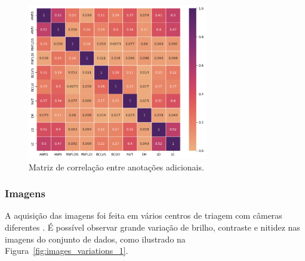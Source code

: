 \documentclass[12pt]{article}
\begin{document}
\begin{figure}[htb]
 \centering
 \includegraphics[width=0.7\textwidth]{images/correlation.png}
 \caption{Matriz de correlação entre anotações adicionais.}
 \label{fig:labels_correlation}
\end{figure}

\subsubsection{Imagens}
\label{sec:dataset:images}

A aquisição das imagens foi feita em vários centros de triagem com câmeras diferentes \cite{justraigs_article}.
É possível observar grande variação de brilho, contraste e nitidez nas imagens do conjunto de dados, como ilustrado na Figura~\ref{fig:images_variations_1}.
\end{document}
